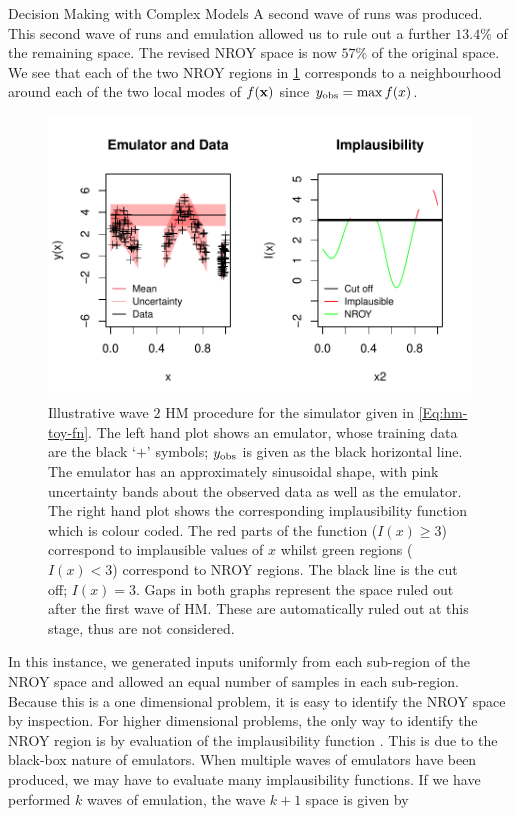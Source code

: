 \begin{chapter}{Decision Making with Complex Models \label{Chap:optimisation}}
A second wave of runs was produced. This second wave of runs and emulation allowed us to rule out a further $13.4\%$ of the remaining space. The revised NROY space is now $57\%$ of the original space. We see that each of the two NROY regions in \cref{Fig:example-hm-graph2} corresponds to a neighbourhood around each of the two local modes of $f(\mathbf{x})$ since $y_{\text{obs}} = \max f(x)$.
\begin{figure}
 \centering
 \includegraphics{fig-optim/implaus2.pdf}
 \caption{Illustrative wave $2$ HM procedure for the simulator given in \cref{Eq:hm-toy-fn}. The left hand plot shows an emulator, whose training data are the black `$+$' symbols; $y_{\text{obs}}$ is given as the black horizontal line. The emulator has an approximately sinusoidal shape, with pink uncertainty bands about the observed data as well as the emulator. The right hand plot shows the corresponding implausibility function which is colour coded. The red parts of the function ($I(x) \geq 3$) correspond to implausible values of $x$ whilst green regions ($I(x) < 3$) correspond to NROY regions. The black line is the cut off; $I(x) = 3$. Gaps in both graphs represent the space ruled out after the first wave of HM. These are automatically ruled out at this stage, thus are not considered. }
 \label{Fig:example-hm-graph2}
\end{figure}
 In this instance, we generated inputs uniformly from each sub-region of the NROY space and allowed an equal number of samples in each sub-region. Because this is a one dimensional problem, it is easy to identify the NROY space by inspection. For higher dimensional problems, the only way to identify the NROY region is by evaluation of the implausibility function \citep{Williamson2013}. This is due to the black-box nature of emulators. When multiple waves of emulators have been produced, we may have to evaluate many implausibility functions. If we have performed $k$ waves of emulation, the wave $k+1$ space is given by

\end{chapter}
